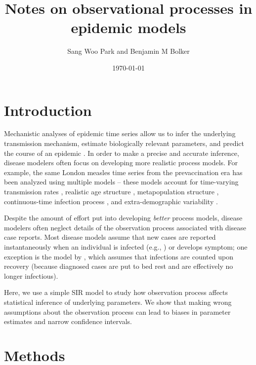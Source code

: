\documentclass{article}\usepackage[]{graphicx}\usepackage[]{color}
\title{Notes on observational processes in epidemic models}
\author{Sang Woo Park and Benjamin M Bolker}
\date{\today}
\begin{document}
\maketitle

\section{Introduction}

Mechanistic analyses of epidemic time series allow us to infer the underlying 
transmission mechanism, estimate biologically relevant parameters, and 
predict the course of an epidemic \citep{breto2009time}. In order to make a 
precise and accurate inference, disease modelers often focus on developing
more realistic process models. For example, the same London measles time 
series from the prevaccination era has been analyzed using multiple models -- 
these models account for time-varying transmission rates \citep{fine1982measles}, 
realistic age structure \citep{schenzle1984age},
metapopulation structure \citep{xia2004measles}, continuous-time infection process 
\citep{cauchemez2008likelihood}, and extra-demographic variability \citep{he2009plug}. 

Despite the amount of effort put into developing \emph{better} process models, disease 
modelers often neglect details of the observation process associated with disease
case reports. Most disease models assume that new cases are reported
instantaneously when an individual is infected (e.g., \cite{martinez2016differential, 
kennedy2018modeling, pons2018serotype}) or develops symptom; one exception is
the model by \citep{he2009plug}, which assumes that infections are counted upon
recovery (because diagnosed cases are put to bed rest and are effectively 
no longer infectious).

Here, we use a simple SIR model to study how observation process affects statistical
inference of underlying parameters. We show that making wrong assumptions about
the observation process can lead to biases in parameter estimates and narrow 
confidence intervals.

\section{Methods}
\end{document}
